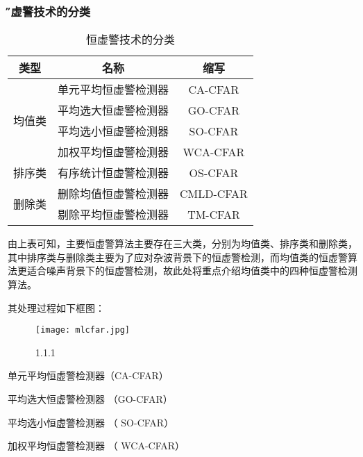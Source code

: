 \documentclass[12pt]{article} %
\begin{document}
 	\subsubsection{\H 恒虚警技术的分类 } 
 	\begin{table}[h]
			\begin{tabular}{|c|c|c|}
			\hline
		类型 & 名称 & 缩写  \\
		\hline
		\multirow{4}{*}{均值类} & 单元平均恒虚警检测器 & CA-CFAR \\
		\cline{2-3}
		& 平均选大恒虚警检测器 &  GO-CFAR\\
		\cline{2-3}
		& 平均选小恒虚警检测器 &  SO-CFAR\\
		\cline{2-3}
		& 加权平均恒虚警检测器 &  WCA-CFAR\\
		\hline
		
		
		排序类&有序统计恒虚警检测器&OS-CFAR \\
		\hline
		\multirow{2}{*}{删除类} & 删除均值恒虚警检测器 & CMLD-CFAR  \\
		\cline{2-3}
		&剔除平均恒虚警检测器 &  TM-CFAR\\
		\hline
\end{tabular}
\caption{恒虚警技术的分类}
\end{table}
		由上表可知，主要恒虚警算法主要存在三大类，分别为均值类、排序类和删除类，其中排序类与删除类主要为了应对杂波背景下的恒虚警检测，而均值类的恒虚警算法更适合噪声背景下的恒虚警检测，故此处将重点介绍均值类中的四种恒虚警检测算法。
		\par 其处理过程如下框图：
		\begin{figure}[h] %
 		  \centering
 		  \texttt{[image: mlcfar.jpg]} 
  		  \caption{1.1.1 }
  		 \label{fig:1.1.1}
		\end{figure}
		\begin{compactitem} 
 			\item 单元平均恒虚警检测器（CA-CFAR）
 			
 			
			\item 平均选大恒虚警检测器  （GO-CFAR）

			\item 平均选小恒虚警检测器  （ SO-CFAR）
			
			\item 加权平均恒虚警检测器 （  WCA-CFAR）


		 \end{compactitem}	
		
\end{document}
